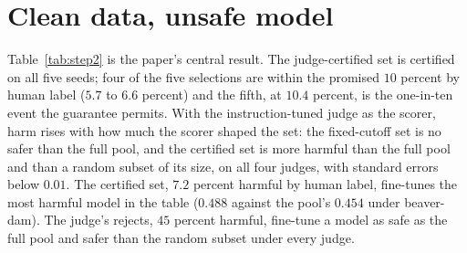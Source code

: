 \documentclass{article} %
\makeatletter
\newcommand{\tabinput}[1]{\@@input#1 }
\makeatother
\begin{document}
\section{Clean data, unsafe model}
\label{sec:behavior}
\begin{table}[t]
\centering\small
\caption{Harmful-generation rate on $500$ held-out prompts after fine-tuning Qwen2.5-0.5B on each training set (pool $25$ percent harmful, $\alpha = 0.10$, $\delta = 0.10$), mean $\pm$ standard error over three seeds (five for the full pool, the random subset, the two certified $n = 400$ sets and the oracle). Harmful fraction is by human label; safety demos is the share of the set whose prompt is harmful and whose response is human-safe. Cert.\ is certified seeds out of seeds run; bold and gray follow the rule of Section~\ref{sec:protocol}.}
\label{tab:step2}
\resizebox{\linewidth}{!}{\tabinput{data/tables/step2_main.tex}}
\end{table}
Table~\ref{tab:step2} is the paper's central result. The judge-certified set is certified on all five seeds; four of the five selections are within the promised $10$ percent by human label ($5.7$ to $6.6$ percent) and the fifth, at $10.4$ percent, is the one-in-ten event the guarantee permits. With the instruction-tuned judge as the scorer, harm rises with how much the scorer shaped the set: the fixed-cutoff set is no safer than the full pool, and the certified set is more harmful than the full pool and than a random subset of its size, on all four judges, with standard errors below $0.01$. The certified set, $7.2$ percent harmful by human label, fine-tunes the most harmful model in the table ($0.488$ against the pool's $0.454$ under beaver-dam). The judge's rejects, $45$ percent harmful, fine-tune a model as safe as the full pool and safer than the random subset under every judge.
\end{document}
